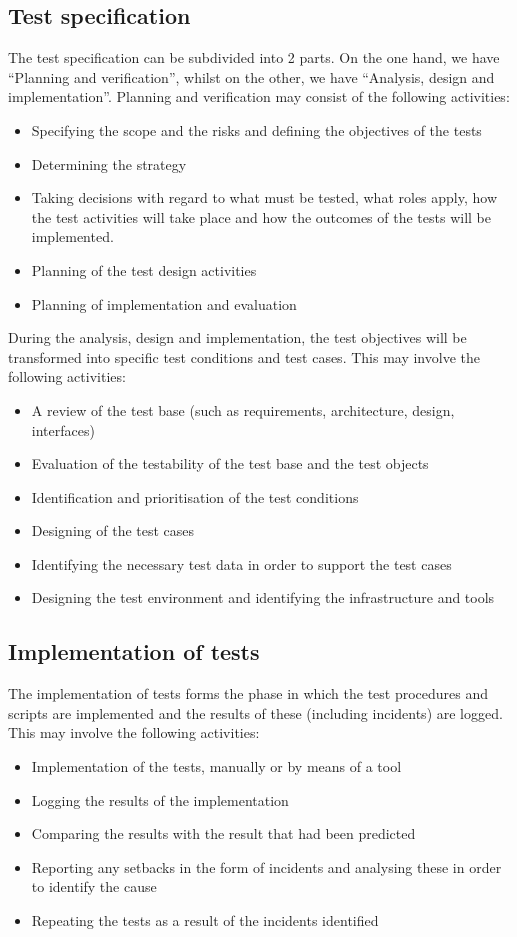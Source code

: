 \documentclass[12pt]{article}
\begin{document}
\subsection{Test specification}
The test specification can be subdivided into 2 parts. On the one hand, we have “Planning and verification”, whilst on the other, we have “Analysis, design and implementation”. \newline
Planning and verification may consist of the following activities: \newline
\begin{itemize}
 \item Specifying the scope and the risks and defining the objectives of the tests 
\item Determining the strategy
\item Taking decisions with regard to what must be tested, what roles apply, how the test activities will take place and how the outcomes of the tests will be implemented. 
\item Planning of the test design activities
\item Planning of implementation and evaluation
\end{itemize}
During the analysis, design and implementation, the test objectives will be transformed into specific test conditions and test cases. This may involve the following activities: \newline
\begin{itemize}
 \item A review of the test base (such as requirements, architecture, design, interfaces) 
\item Evaluation of the testability of the test base and the test objects 
\item Identification and prioritisation of the test conditions 
\item Designing of the test cases
\item Identifying the necessary test data in order to support the test cases 
\item Designing the test environment and identifying the infrastructure and tools 
\end{itemize}
\subsection{Implementation of tests}
The implementation of tests forms the phase in which the test procedures and scripts are implemented and the results of these (including incidents) are logged. This may involve the following activities: \newline
\begin{itemize}
 \item Implementation of the tests, manually or by means of a tool  
\item Logging the results of the implementation 
\item Comparing the results with the result that had been predicted 
\item Reporting any setbacks in the form of incidents and analysing these in order to identify the cause 
\item Repeating the tests as a result of the incidents identified 
\end{itemize}
\end{document}
